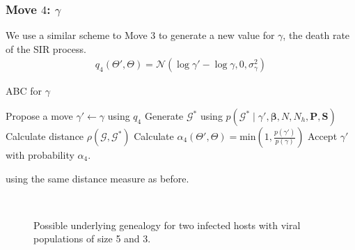 \documentclass[]{report}
\begin{document}
\subsubsection{Move $4$: $\gamma$}
We use a similar scheme to Move $3$ to generate a new value for $\gamma$, the death rate of the SIR process.
\begin{eqnarray}
q_4(\Theta',\Theta)= \mathcal{N}(\log \gamma' - \log \gamma, 0 , \sigma_{\gamma}^2)
\end{eqnarray}
\begin{algorithm}
\caption{ABC for $\gamma$ \label{alg:gamma}}
\begin{algorithmic}
\STATE Propose a move $\gamma'\gets \gamma$ using $q_4$
\STATE Generate $\mathcal{G}^*$ using $p(\mathcal{G}^*\mid \gamma', \boldsymbol{\beta}, N, N_h, \mathbf{P}, \mathbf{S})$
\STATE Calculate distance $\rho(\mathcal{G},\mathcal{G}^*)$
\STATE Calculate $\alpha_{4}(\Theta',\Theta)=\textrm{min}\left(1,\frac{p(\gamma')}{p(\gamma)} \right)$
\STATE Accept $\gamma'$ with probability $\alpha_4$.
\ENDIF
\end{algorithmic}
\end{algorithm}
using the same distance measure as before.





\begin{figure}[h]
\centering
{}\\
\caption{Possible underlying genealogy for two infected hosts with viral populations of size 5 and 3.}
\end{figure}
\end{document}
